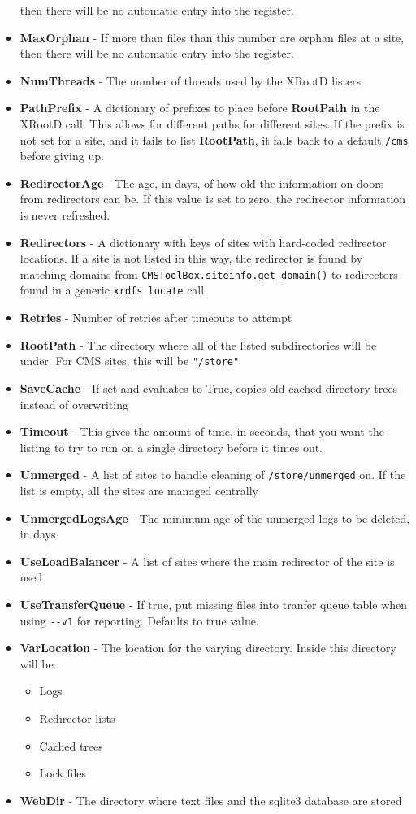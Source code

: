 \begin{itemize}
then there will be no automatic entry into the register.
\item {\bf MaxOrphan} - If more than files than this number are orphan files at a site,
then there will be no automatic entry into the register.
\item {\bf NumThreads} - The number of threads used by the XRootD listers
\item {\bf PathPrefix} -
  A dictionary of prefixes to place before {\bf RootPath} in the XRootD call.
  This allows for different paths for different sites.
  If the prefix is not set for a site, and it fails to list {\bf RootPath},
  it falls back to a default \texttt{/cms} before giving up.
\item {\bf RedirectorAge} -
  The age, in days, of how old the information on doors from redirectors can be.
  If this value is set to zero, the redirector information is never refreshed.
\item {\bf Redirectors} - A dictionary with keys of sites with hard-coded redirector locations.
  If a site is not listed in this way, the redirector is found by matching domains from
  \texttt{CMSToolBox.siteinfo.get\_domain()}
  to redirectors found in a generic \texttt{xrdfs locate} call.
\item {\bf Retries} - Number of retries after timeouts to attempt
\item {\bf RootPath} - The directory where all of the listed subdirectories will be under.
  For CMS sites, this will be \texttt{"/store"}
\item {\bf SaveCache} -
  If set and evaluates to True, copies old cached directory trees instead of overwriting
\item {\bf Timeout} -
  This gives the amount of time, in seconds, that you want the listing to try to run
  on a single directory before it times out.
\item {\bf Unmerged} - A list of sites to handle cleaning of \texttt{/store/unmerged} on.
  If the list is empty, all the sites are managed centrally
\item {\bf UnmergedLogsAge} - The minimum age of the unmerged logs to be deleted, in days
\item {\bf UseLoadBalancer} - A list of sites where the main redirector of the site is used
\item {\bf UseTransferQueue} - If true, put missing files into tranfer queue table
  when using \texttt{-{-}v1} for reporting. Defaults to true value.
\item {\bf VarLocation} - The location for the varying directory.
  Inside this directory will be:
  \begin{itemize}
  \item Logs
  \item Redirector lists
  \item Cached trees
  \item Lock files
  \end{itemize}
\item {\bf WebDir} - The directory where text files and the sqlite3 database are stored
\end{itemize}


